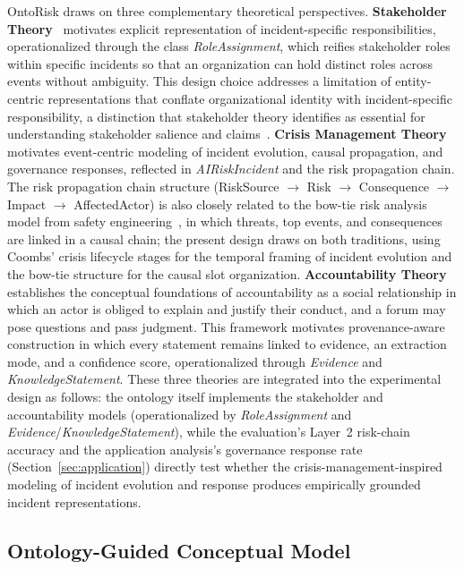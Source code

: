 \documentclass[a4paper,fleqn]{cas-dc}
\begin{document}
OntoRisk draws on three complementary theoretical perspectives.
\textbf{Stakeholder Theory}~\cite{Freeman_2010} motivates explicit
representation of incident-specific responsibilities, operationalized
through the class \textit{RoleAssignment}, which reifies stakeholder
roles within specific incidents so that an organization can hold
distinct roles across events without ambiguity.
This design choice addresses a limitation of entity-centric
representations that conflate organizational identity with
incident-specific responsibility, a distinction that stakeholder
theory identifies as essential for understanding stakeholder
salience and claims~\cite{Mitchell1997}.
\textbf{Crisis Management Theory}~\cite{Coombs2007} motivates
event-centric modeling of incident evolution, causal propagation, and
governance responses, reflected in \textit{AIRiskIncident} and the
risk propagation chain.
The risk propagation chain structure
(RiskSource $\to$ Risk $\to$ Consequence $\to$ Impact $\to$
AffectedActor) is also closely related to the bow-tie risk analysis
model from safety engineering~\cite{ISO31010}, in which threats,
top events, and consequences are linked in a causal chain;
the present design draws on both traditions, using Coombs' crisis
lifecycle stages for the temporal framing of incident evolution and
the bow-tie structure for the causal slot organization.
\textbf{Accountability
Theory}~\cite{bovens2007analysing} establishes the
conceptual foundations of accountability as a social relationship
in which an actor is obliged to explain and justify their conduct,
and a forum may pose questions and pass judgment.
This framework motivates provenance-aware construction in which every
statement remains linked to evidence, an extraction mode, and a
confidence score, operationalized through \textit{Evidence} and
\textit{KnowledgeStatement}.
These three theories are integrated into the experimental design as
follows: the ontology itself implements the stakeholder and
accountability models (operationalized by \textit{RoleAssignment}
and \textit{Evidence}/\textit{KnowledgeStatement}), while the
evaluation's Layer~2 risk-chain accuracy and the application
analysis's governance response rate (Section~\ref{sec:application})
directly test whether the crisis-management-inspired modeling of
incident evolution and response produces empirically grounded
incident representations.

\subsection{Ontology-Guided Conceptual Model}
\label{sec:ontology}
\end{document}
